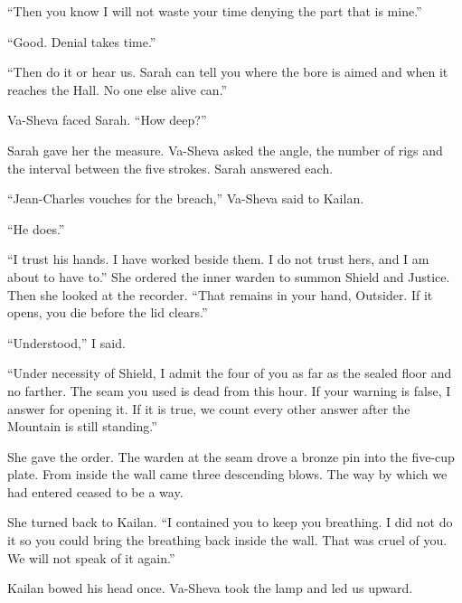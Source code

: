 ``Then you know I will not waste your time denying the part that is mine.''\par

``Good. Denial takes time.''\par

``Then do it or hear us. Sarah can tell you where the bore is aimed and when it reaches the Hall. No one else alive can.''\par

Va-Sheva faced Sarah. ``How deep?''\par

Sarah gave her the measure. Va-Sheva asked the angle, the number of rigs and the interval between the five strokes. Sarah answered each.\par

``Jean-Charles vouches for the breach,'' Va-Sheva said to Kailan.\par

``He does.''\par

``I trust his hands. I have worked beside them. I do not trust hers, and I am about to have to.'' She ordered the inner warden to summon Shield and Justice. Then she looked at the recorder. ``That remains in your hand, Outsider. If it opens, you die before the lid clears.''\par

``Understood,'' I said.\par

``Under necessity of Shield, I admit the four of you as far as the sealed floor and no farther. The seam you used is dead from this hour. If your warning is false, I answer for opening it. If it is true, we count every other answer after the Mountain is still standing.''\par

She gave the order. The warden at the seam drove a bronze pin into the five-cup plate. From inside the wall came three descending blows. The way by which we had entered ceased to be a way.\par

She turned back to Kailan. ``I contained you to keep you breathing. I did not do it so you could bring the breathing back inside the wall. That was cruel of you. We will not speak of it again.''\par

Kailan bowed his head once. Va-Sheva took the lamp and led us upward.\par

